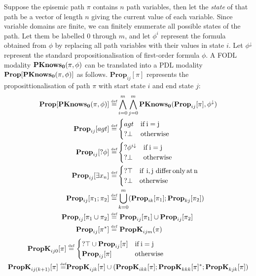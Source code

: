 Suppose the episemic path $\pi$ contains $n$ path variables, then
let the \emph{state }of that path be a vector of length $n$ giving
the current value of each variable. Since variable domains are finite,
we can finitely enumerate all possible states of the path. Let them
be labelled $0$ through $m$, and let $\phi^{i}$ represent the formula
obtained from $\phi$ by replacing all path variables with their values
in state $i$. Let $\phi^{\downarrow}$ represent the standard propositionalisation
of first-order formula $\phi$. A FODL modality $\mathbf{PKnows_{0}}(\pi,\phi)$
can be translated into a PDL modality $\mathbf{Prop}[\mathbf{PKnows_{0}}(\pi,\phi)]$
as follows. $\mathbf{Prop}_{ij}[\pi]$ represents the proposittionalisation
of path $\pi$ with start state $i$ and end state $j$:\begin{align*}
\mathbf{Prop}[\mathbf{PKnows_{0}}(\pi,\phi)]\stackrel{\mbox{\tiny def}}{=} & \bigwedge_{i=0}^{m}\bigwedge_{j=0}^{m}\mathbf{PKnows_{0}}(\mathbf{Prop}_{ij}[\pi],\phi^{\downarrow})\\
\mathbf{Prop}_{ij}[agt]\stackrel{\mbox{\tiny def}}{=} & \begin{cases}
agt & \mathrm{if\, i=j}\\
?\bot & \mathrm{otherwise}\end{cases}\\
\mathbf{Prop}_{ij}[?\phi]\stackrel{\mbox{\tiny def}}{=} & \begin{cases}
?\phi^{i\downarrow} & \mathrm{if\, i=j}\\
?\bot & \mathrm{otherwise}\end{cases}\\
\mathbf{Prop}_{ij}[\exists x_{n}]\stackrel{\mbox{\tiny def}}{=} & \begin{cases}
?\top & \mathrm{if\,\, i,j\,\, differ\, only\, at\, n}\\
?\bot & \mathrm{otherwise}\end{cases}\\
\mathbf{Prop}_{ij}[\pi_{1};\pi_{2}]\stackrel{\mbox{\tiny def}}{=} & \bigcup_{k=0}^{m}(\mathbf{Prop}_{ik}[\pi_{1}];\mathbf{Prop}_{kj}[\pi_{2}])\\
\mathbf{Prop}_{ij}[\pi_{1}\cup\pi_{2}]\stackrel{\mbox{\tiny def}}{=} & \,\,\mathbf{Prop}_{ij}[\pi_{1}]\cup\mathbf{Prop}_{ij}[\pi_{2}]\\
\mathbf{Prop}_{ij}[\pi^{*}]\stackrel{\mbox{\tiny def}}{=} & \,\,\mathbf{PropK}_{ijm}(\pi)\end{align*}
\begin{align*}
\mathbf{PropK}_{ij0}[\pi] & \stackrel{\mbox{\tiny def}}{=}\begin{cases}
?\top\cup\mathbf{Prop}_{ij}[\pi] & \mathrm{if\, i=j}\\
\mathbf{Prop}_{ij}[\pi] & \mathrm{otherwise}\end{cases}\\
\mathbf{PropK}_{ij(k+1)}[\pi]\stackrel{\mbox{\tiny def}}{=} & \mathbf{PropK}_{ijk}[\pi]\cup(\mathbf{PropK}_{ikk}[\pi];\mathbf{PropK}_{kkk}[\pi]^{*};\mathbf{PropK}_{kjk}[\pi])\end{align*}


